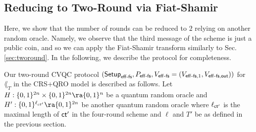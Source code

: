 



\subsection{Reducing to Two-Round via Fiat-Shamir}
Here, we show that the number of rounds can be reduced to $2$ relying on another random oracle.
Namely, we observe that the third message of the scheme is just a public coin, and so we can apply the Fiat-Shamir transform similarly to Sec.\ref{sec:tworound}.
In the following, we describe the protocol for completeness.

Our two-round CVQC protocol $(\mathsf{Setup}_{\mathsf{eff}\text{-}\mathsf{fs}},P_{\mathsf{eff}\text{-}\mathsf{fs}},V_{\mathsf{eff}\text{-}\mathsf{fs}}=(V_{\mathsf{eff}\text{-}\mathsf{fs},1},V_{\mathsf{eff}\text{-}\mathsf{fs},\mathsf{out}}))$ for $\lang_T$ in the CRS+QRO model is described as follows.
Let $H:\bit^{2\secpar}\times \bit^{2\secpar}\ra \bit^{\secpar}$ be a quantum random oracle and $H':\bit^{\ell_{ct'}}\ra \bit^{2\secpar}$ be another quantum random oracle where $\ell_{\mathsf{ct}'}$ is the maximal length of $\mathsf{ct}'$ in the four-round scheme and $\ell$ and $T'$ be as defined in the previous section.


